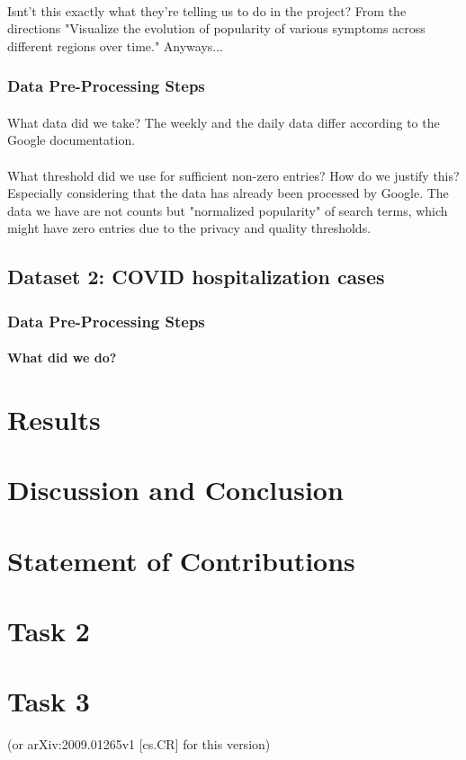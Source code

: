 \documentclass{article}
\begin{document}
\paragraph{}
Isnt't this exactly what they're telling us to do in the project?
From the directions "Visualize the evolution of popularity of various symptoms across different regions over time." Anyways...
\subsubsection*{Data Pre-Processing Steps}
\paragraph{}
What data did we take? The weekly and the daily data differ according to the Google documentation. 
\paragraph{}
What threshold did we use for sufficient non-zero entries? How do we justify this? Especially considering that the data has already been processed by Google. The data we have are not counts but "normalized popularity" of search terms, which might have zero entries due to the privacy and quality thresholds. 




\subsection*{Dataset 2: COVID hospitalization cases}
\subsubsection*{Data Pre-Processing Steps}
\paragraph{What did we do?}

\section*{Results}
\section*{Discussion and Conclusion}
\section*{Statement of Contributions}




\section*{Task 2}


\section*{Task 3}

\begin{thebibliography}{}
	(or arXiv:2009.01265v1 [cs.CR] for this version)
\end{thebibliography}
\end{document}

